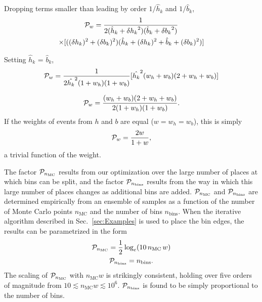 \documentclass[twocolumn,twoside,prd]{revtex4} %
\begin{document}
Dropping terms smaller than leading by order $1/\hat h_k$ and $1/\hat b_k$,
\begin{multline}
\label{eqn:PenaltyTermWComplicated4}
{\cal P}_w = \frac {1}{2(\hat h_k+{\delta h_k}^2)(\hat b_k+{\delta b_k}^2)} \\
\times [((\delta h_k)^2 + (\delta b_k)^2)( \hat h_k +(\delta h_k)^2 + \hat b_k +(\delta b_k)^2)]
\end{multline}

Setting $\hat h_k$ = $\hat b_k$,
\begin{equation}
\label{eqn:PenaltyTermWComplicated5}
{\cal P}_w = \frac {1}{2 \hat {h_k}^2(1+w_h)(1+w_b)} [\hat {h_k}^2(w_h+w_b)(2+w_h+w_b)]
\end{equation}
 
\begin{equation}
\label{eqn:PenaltyTermWComplicated}
{\cal P}_w = \frac{(w_h+w_b)(2+w_h+w_b)}{2(1+w_h)(1+w_b)}.
\end{equation}
If the weights of events from $h$ and $b$ are equal ($w=w_h=w_b$), this is simply
\begin{equation}
\label{eqn:PenaltyTermWSimple}
{\cal P}_w = \frac{2 w}{1+w},
\end{equation}
a trivial function of the weight.

The factor ${\cal P}_{n_\text{MC}}$ results from our optimization over the large number of places at which bins can be split, and the factor ${\cal P}_{n_\text{bins}}$ results from the way in which this large number of places changes as additional bins are added.  ${\cal P}_{n_\text{MC}}$ and ${\cal P}_{n_\text{bins}}$ are determined empirically from an ensemble of samples as a function of the number of Monte Carlo points $n_\text{MC}$ and the number of bins $n_\text{bins}$.  When the iterative algorithm described in Sec.~\ref{sec:Examples} is used to place the bin edges, the results can be parametrized in the form
\begin{gather}
{\cal P}_{n_\text{MC}} = \frac{1}{2} \log_e ( 10 \, {n_\text{MC}} \, w ) \\
{\cal P}_{n_\text{bins}} = n_\text{bins}.
\end{gather}
The scaling of ${\cal P}_{n_\text{MC}}$ with ${n_\text{MC}}w$ is strikingly consistent, holding over five orders of magnitude from $10 \lesssim {n_\text{MC}} w \lesssim 10^6$.  ${\cal P}_{n_\text{bins}}$ is found to be simply proportional to the number of bins.
\end{document}
